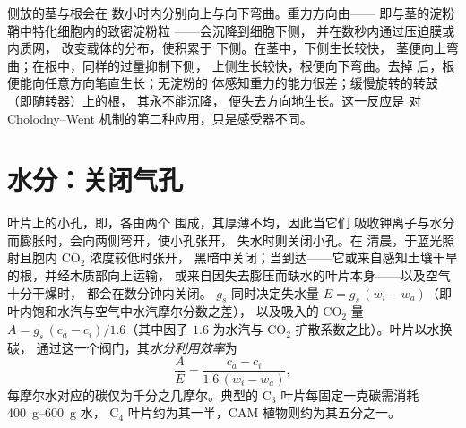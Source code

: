 \begin{proposition}[向重力性]\label{prop:b2:plant-plasticity:gravitropism}
侧放的茎与根会在
数小时内分别向上与向下弯曲。重力方向由\emph{}——
即与茎的淀粉鞘中特化细胞内的致密淀粉粒
——会沉降到细胞下侧，
并在数秒内通过压迫膜或内质网，
改变载体的分布，使积累于
下侧。在茎中，下侧生长较快，
茎便向上弯曲；在根中，同样的过量抑制下侧，
上侧生长较快，根便向下弯曲。去掉
后，根便能向任意方向笔直生长；无淀粉的
体感知重力的能力很差；缓慢旋转的转鼓（即随转器）上的根，
其永不能沉降，
便失去方向地生长。这一反应是
对 Cholodny--Went 机制的第二种应用，只是感受器不同。
\end{proposition}

\section{水分：关闭气孔}

\begin{proposition}[气孔控制]\label{prop:b2:plant-plasticity:stomata}
叶片上的小孔，即\emph{}，各由两个
\emph{}围成，其厚薄不均，因此当它们
吸收钾离子与水分而膨胀时，会向两侧弯开，使小孔张开，
失水时则关闭小孔。在
清晨，于蓝光照射且胞内 $\mathrm{CO_2}$ 浓度较低时张开，
黑暗中关闭；当\emph{}到达——它或来自感知土壤干旱的根，并经木质部向上运输，
或来自因失去膨压而缺水的叶片本身——以及空气十分干燥时，
都会在数分钟内关闭。\emph{} $g_s$
同时决定失水量 $E = g_s\,(w_i - w_a)$（即
叶内饱和水汽与空气中水汽摩尔分数之差），
以及吸入的 $\mathrm{CO_2}$ 量 $A = g_s\,(c_a -
c_i)/1.6$（其中因子 $1.6$ 为水汽与
$\mathrm{CO_2}$ 扩散系数之比）。叶片以水换碳，
通过这一个阀门，其\emph{水分利用效率}为
\[
\frac{A}{E} = \frac{c_a - c_i}{1.6\,(w_i - w_a)},
\]
每摩尔水对应的碳仅为千分之几摩尔。典型的
C$_3$ 叶片每固定一克碳需消耗 \qtyrange{400}{600}{g} 水，
C$_4$ 叶片约为其一半，CAM 植物则约为其五分之一。
\end{proposition}

